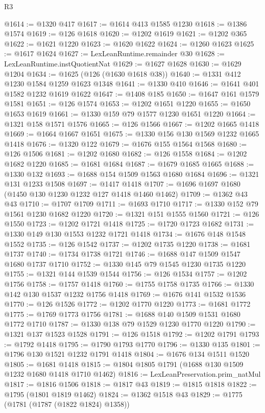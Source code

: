\begin{lexlean}{R3}
\begin{coremodule}
@1614 := @1320 @417
@1617 := @1614 @413 @1585 @1230
@1618 := @1386 @1574
@1619 := @126 @1618
@1620 := @1202 @1619
@1621 := @1202 @365
@1622 := @1621 @1220
@1623 := @1620 @1622
@1624 := @1260 @1623
@1625 := @1617 @1624
@1627 := LexLeanRuntime.remainder @30
@1628 := LexLeanRuntime.instQuotientNat
@1629 := @1627 @1628
@1630 := @1629 @1204
@1634 := @1625 (@126 (@1630 @1618 @38))
@1640 := @1331 @412 @1230 @1584 @1259 @1623 @1348
@1641 := @1330 @410
@1646 := @1641 @401 @1582 @1232 @1619 @1622
@1647 := @1408 @185
@1650 := @1647 @161 @1579 @1581
@1651 := @126 @1574
@1653 := @1202 @1651 @1220
@1655 := @1650 @1653 @1619
@1661 := @1330 @159 @79 @1577 @1230 @1651 @1220
@1664 := @1321 @158 @1571 @1576
@1665 := @126 @1566
@1667 := @1202 @1665 @1418
@1669 := @1664 @1667 @1651
@1675 := @1330 @156 @130 @1569 @1232 @1665 @1418
@1676 := @1320 @122
@1679 := @1676 @155 @1564 @1568
@1680 := @126 @1506
@1681 := @1202 @1680
@1682 := @126 @1558
@1684 := @1202 @1682 @1220
@1685 := @1681 @1684
@1687 := @1679 @1685 @1665
@1688 := @1330 @132
@1693 := @1688 @154 @1509 @1563 @1680 @1684
@1696 := @1321 @131 @1233 @1508
@1697 := @1417 @1418
@1707 := @1696 @1697 @1680 (@1450 @130 @1230 @1232 @127 @1418 @1460 @1462)
@1709 := @1362 @43 @43
@1710 := @1707 @1709
@1711 := @1693 @1710
@1717 := @1330 @152 @79 @1561 @1230 @1682 @1220
@1720 := @1321 @151 @1555 @1560
@1721 := @126 @1550
@1723 := @1202 @1721 @1418
@1725 := @1720 @1723 @1682
@1731 := @1330 @149 @130 @1553 @1232 @1721 @1418
@1734 := @1676 @148 @1548 @1552
@1735 := @126 @1542
@1737 := @1202 @1735 @1220
@1738 := @1681 @1737
@1740 := @1734 @1738 @1721
@1746 := @1688 @147 @1509 @1547 @1680 @1737 @1710
@1752 := @1330 @145 @79 @1545 @1230 @1735 @1220
@1755 := @1321 @144 @1539 @1544
@1756 := @126 @1534
@1757 := @1202 @1756
@1758 := @1757 @1418
@1760 := @1755 @1758 @1735
@1766 := @1330 @142 @130 @1537 @1232 @1756 @1418
@1769 := @1676 @141 @1532 @1536
@1770 := @126 @1526
@1772 := @1202 @1770 @1220
@1773 := @1681 @1772
@1775 := @1769 @1773 @1756
@1781 := @1688 @140 @1509 @1531 @1680 @1772 @1710
@1787 := @1330 @138 @79 @1529 @1230 @1770 @1220
@1790 := @1321 @137 @1523 @1528
@1791 := @126 @1518
@1792 := @1202 @1791
@1793 := @1792 @1418
@1795 := @1790 @1793 @1770
@1796 := @1330 @135
@1801 := @1796 @130 @1521 @1232 @1791 @1418
@1804 := @1676 @134 @1511 @1520
@1805 := @1681 @1418
@1815 := @1804 @1805 @1791 (@1688 @130 @1509 @1232 @1680 @1418 @1710 @1462)
@1816 := LexLeanPreservation.prim_natMul
@1817 := @1816 @1506
@1818 := @1817 @43
@1819 := @1815 @1818
@1822 := @1795 (@1801 @1819 @1462)
@1824 := @1362 @1518 @43
@1829 := @1775 (@1781 (@1787 (@1822 @1824) @1358))

\end{coremodule}
\end{lexlean}
